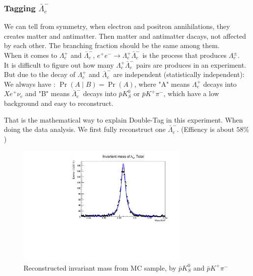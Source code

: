 \documentclass{beamer}
\begin{document}
\subsubsection{Tagging $\bar{\Lambda}_c^-$}
\begin{frame}
    We can tell from symmetry, when electron and positron annihilations, they creates matter and antimatter. Then matter and antimatter dacays, not affected by each other. The branching fraction should be the same among them.\\
    \vspace{0.2in}
    When it comes to $\Lambda_c^+$ and $\bar{\Lambda}_c^-$, $e^+e^-\rightarrow \Lambda_c^+\bar{\Lambda}_c^-$ is the process that produces $\Lambda_c^\pm$. \\
    \vspace{0.2in}
    It is difficult to figure out how many $\Lambda_c^+\bar{\Lambda}_c^-$ pairs are produces in an experiment. But due to the decay of $\Lambda_c^+$ and $\bar{\Lambda}_c^-$ are independent (statistically independent):\\
    \vspace{0.2in}
    We always have : $\Pr(A\mid B)=\Pr(A)$, where "A" means $\Lambda_c^+$ decays into $X e^+ \nu_e$ and "B" means $\bar{\Lambda}_c^-$ decays into $\bar{p} K^0_S$ or $\bar{p} K^+ \pi^-$, which have a low background and easy to reconstruct.
\end{frame}

\begin{frame}
    That is the mathematical way to explain Double-Tag in this experiment. When doing the data analysis. We first fully reconstruct one $\bar{\Lambda}_c^-$. (Effiency is about $58\%$)
    \begin{figure}
        \centering
        \includegraphics[width = 0.75\textwidth]{Overallim.pdf}
        \caption{Reconstructed invariant mass from MC sample, by $\bar{p} K^0_S$ and $\bar{p} K^+ \pi^-$}
        \label{fig: mBC data}
    \end{figure}
\end{frame}
\end{document}
